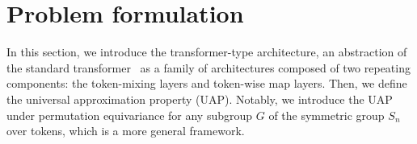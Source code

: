 \documentclass{article}
\newcommand{\lt}[1]{{\footnotesize\textcolor{cyan!60!black}{\tt TL: #1}}}
\newcommand{\ql}[1]{{\footnotesize\textcolor{red}{QL: #1}}}
\begin{document}



\section{Problem formulation}
\label{sec:preliminaries}
In this section, we introduce the transformer-type architecture,
an abstraction of the standard transformer~\cite{vaswani2017attention} as a family of architectures composed of two repeating components: the token-mixing layers and token-wise map layers.
Then, we define the universal approximation property (UAP). Notably, we introduce the UAP under permutation equivariance for any subgroup $G$ of the symmetric group $S_n$ over tokens, which is a more general framework.
\end{document}
